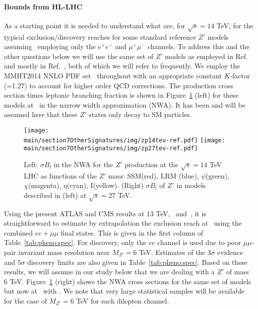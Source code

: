 \paragraph*{Bounds from HL-LHC}
As a starting point it is needed to understand what are, for $\sqrt s=14$ TeV, for the typical exclusion/discovery reaches for some standard reference $Z'$ models assuming \intlumihllhc\ employing only the $e^+e^-$ and $\mu^+\mu^-$ channels. To address this and the other questions below we will use the same set of $Z'$ models as employed
in Ref.~\cite{Rizzo:2014xma} and mostly in Ref.~\cite{Han:2013mra}, both of which we will refer to frequently. We employ the MMHT2014 NNLO PDF set~\cite{Harland-Lang:2014zoa}
throughout with an appropriate constant $K$-factor (=1.27) to account for higher order QCD corrections. The production cross section times leptonic branching fraction is shown in Figure~\ref{fig:pheno:toy} (left) for these models at \sqrtslhc\ in the narrow width approximation (NWA). It has been and will be assumed here that these $Z'$ states only decay to SM particles.


\begin{figure}[htbp]
  \centering
    \texttt{[image: \\main/section7OtherSignatures/img/zp14tev-ref.pdf]}
    \texttt{[image: \\main/section7OtherSignatures/img/zp27tev-ref.pdf]}
    \caption{Left: $\sigma B_l$ in the NWA for the $Z'$ production at the $\sqrt s=14$ TeV LHC as functions of the $Z'$ mass: SSM(red), LRM (blue), $\psi$(green), $\chi$(magenta),
$\eta$(cyan), I(yellow). (Right) $\sigma B_l$ of $Z'$ in models described in (left) at $\sqrt s=27$ TeV.}
\label{fig:pheno:toy}
\end{figure}

Using the present ATLAS and CMS results at 13 TeV,~\cite{Aaboud:2017buh} and~\cite{Sirunyan:2018exx}, it is straightforward to estimate by extrapolation the
exclusion reach at \sqrtslhc\ using the combined $ee+\mu\mu$ final states. This is given in the first column of Table~\ref{tab:pheno:spec}. For discovery, only the $ee$ channel is used due to poor $\mu\mu$-pair invariant mass resolution near $M_{Z'}=6$ TeV. Estimates of the $3\sigma$ evidence and $5\sigma$
discovery limits are also given in Table~\ref{tab:pheno:spec}. Based on these results, we will assume in our study below that we are dealing with a $Z'$ of mass 6 TeV. Figure~\ref{fig:pheno:toy} (right) shows the NWA cross sections for the same set of models but now at \sqrtshelhc\ with \intlumihelhc. We note that very large statistical samples will be available for the case of $M_{Z'}=6$ TeV
for each dilepton channel.

